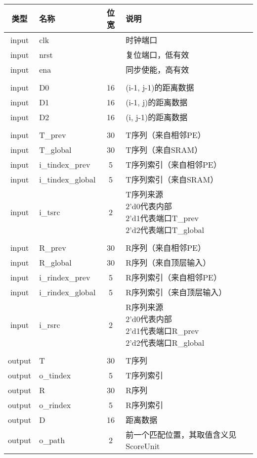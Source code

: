 \documentclass[UTF8]{ctexart}
\begin{document}
\begin{table}[!h]
    \centering
    \begin{tabular}[t]{clcl}
        \toprule
        类型 & 名称 & 位宽 & 说明 \\
        \midrule
        input & clk && 时钟端口 \\[5pt]
        input & nrst && 复位端口，低有效 \\[5pt]
        input & ena && 同步使能，高有效 \\[5pt]
        \\
        input & D0 & 16 & (i-1, j-1)的距离数据 \\[5pt]
        input & D1 & 16 & (i-1, j)的距离数据 \\[5pt]
        input & D2 & 16 & (i, j-1)的距离数据 \\[5pt]
        \\
        input & T\_prev & 30 & T序列（来自相邻PE） \\[5pt]
        input & T\_global & 30 & T序列（来自SRAM） \\[5pt]
        input & i\_tindex\_prev & 5 & T序列索引（来自相邻PE） \\[5pt]
        input & i\_tindex\_global & 5 & T序列索引（来自SRAM） \\[5pt]
        input & i\_tsrc & 2 & \makecell[l]{T序列来源\\2'd0代表内部\\2'd1代表端口T\_prev\\2'd2代表端口T\_global} \\[5pt]
        \\
        input & R\_prev & 30 & R序列（来自相邻PE） \\[5pt]
        input & R\_global & 30 & R序列（来自顶层输入） \\[5pt]
        input & i\_rindex\_prev & 5 & R序列索引（来自相邻PE） \\[5pt]
        input & i\_rindex\_global & 5 & R序列索引（来自顶层输入） \\[5pt]
        input & i\_rsrc & 2 & \makecell[l]{R序列来源\\2'd0代表内部\\2'd1代表端口R\_prev\\2'd2代表端口R\_global} \\[5pt]
        \\
        output & T & 30 & T序列 \\[5pt]
        output & o\_tindex & 5 & T序列索引 \\[5pt]
        output & R & 30 & R序列 \\[5pt]
        output & o\_rindex & 5 & R序列索引 \\[5pt]
        output & D & 16 & 距离数据 \\[5pt]
        output & o\_path & 2 & 前一个匹配位置，其取值含义见ScoreUnit \\[5pt]
        \bottomrule
    \end{tabular}
\end{table}
\end{document}
